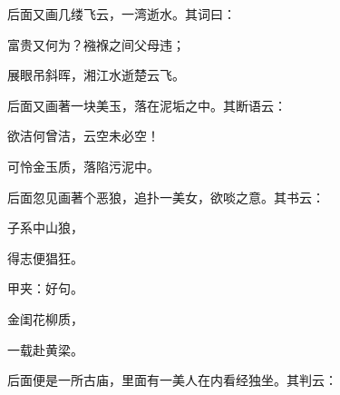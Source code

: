 \begin{parag}
    后面又画几缕飞云，一湾逝水。其词曰：
\end{parag}


\begin{poem}
    \begin{pl}富贵又何为？襁褓之间父母违；\end{pl}

    \begin{pl}展眼吊斜晖，湘江水逝楚云飞。\end{pl}

\end{poem}


\begin{parag}
    后面又画著一块美玉，落在泥垢之中。其断语云：
\end{parag}


\begin{poem}
    \begin{pl}欲洁何曾洁，云空未必空！\end{pl}

    \begin{pl}可怜金玉质，落陷污泥中。\end{pl}
\end{poem}


\begin{parag}
    后面忽见画著个恶狼，追扑一美女，欲啖之意。其书云：
\end{parag}


\begin{poem}
    \begin{pl}子系中山狼，\end{pl}

    \begin{pl}得志便猖狂。\end{pl}\begin{note}甲夹：好句。\end{note}

    \begin{pl}金闺花柳质，\end{pl}

    \begin{pl}一载赴黄梁。\end{pl}

\end{poem}


\begin{parag}
    后面便是一所古庙，里面有一美人在内看经独坐。其判云：
\end{parag}


